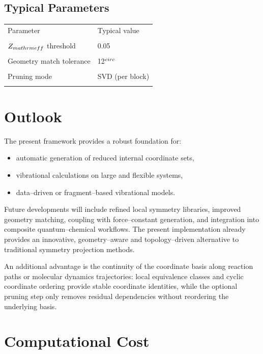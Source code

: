 \documentclass[11pt,a4paper]{article}
\begin{document}
\subsection{Typical Parameters}

\begin{center}
\begin{tabular}{ll}
\hline
Parameter & Typical value \\\\
\hline
$Z_{\\mathrm{eff}}$ threshold & 0.05 \\\\
Geometry match tolerance & 12$^{\\circ}$ \\\\
Pruning mode & SVD (per block) \\\\
\hline
\end{tabular}
\end{center}

\section{Outlook}

The present framework provides a robust foundation for:
\begin{itemize}
  \item automatic generation of reduced internal coordinate sets,
  \item vibrational calculations on large and flexible systems,
  \item data--driven or fragment--based vibrational models.
\end{itemize}

Future developments will include refined local symmetry libraries,
improved geometry matching, coupling with force--constant generation,
and integration into composite quantum--chemical workflows. The present
implementation already provides an innovative, geometry--aware and
topology--driven alternative to traditional symmetry projection methods.

An additional advantage is the continuity of the coordinate basis along
reaction paths or molecular dynamics trajectories: local equivalence classes
and cyclic coordinate ordering provide stable coordinate identities, while the
optional pruning step only removes residual dependencies without reordering
the underlying basis.

\section{Computational Cost}
\end{document}
